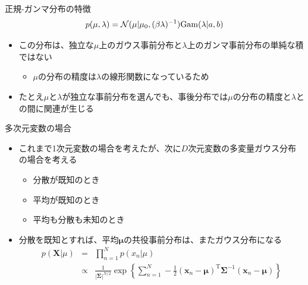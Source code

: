   \begin{frame}{正規-ガンマ分布の特徴}
   \begin{equation*}
    p(\mu,\lambda)=\mathcal{N}(\mu|\mu_0, (\beta\lambda)^{-1}){\rm Gam}(\lambda|a,b)
   \end{equation*}
   \begin{itemize}
    \item この分布は、独立な$\mu$上のガウス事前分布と$\lambda$上のガンマ事前分布の単純な積ではない
          \begin{itemize}
           \item $\mu$の分布の精度は$\lambda$の線形関数になっているため
          \end{itemize}
    \item たとえ$\mu$と$\lambda$が独立な事前分布を選んでも、事後分布では$\mu$の分布の精度と$\lambda$との間に関連が生じる
   \end{itemize}
  \end{frame}

  \begin{frame}{多次元変数の場合}
   \begin{itemize}
    \item これまで1次元変数の場合を考えたが、次に$D$次元変数の多変量ガウス分布の場合を考える
          \begin{itemize}
           \item 分散が既知のとき
           \item 平均が既知のとき
           \item 平均も分散も未知のとき
          \end{itemize}
    \item \alert{分散を既知}とすれば、平均$\bm{\mu}$の共役事前分布は、またガウス分布になる
          \begin{eqnarray*}
           p(\bm{X}|\mu) &=& \prod_{n=1}^{N}p(x_n|\mu)\\
           & \propto&\frac{1}{|\bm{\Sigma}|^{N/2}}\exp\left\{\sum_{n=1}^{N}-\frac{1}{2}(\bm{x}_n-\bm{\mu})^{\mathrm{T}}\bm{\Sigma}^{-1}(\bm{x}_n-\bm{\mu})\right\}
          \end{eqnarray*}
   \end{itemize}
  \end{frame}

